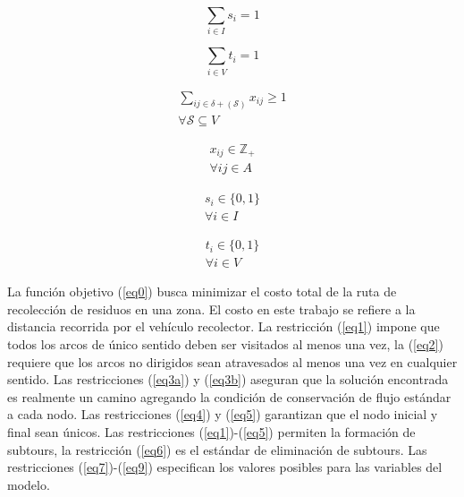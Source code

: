 \begin{equation} \tag{4} \label{eq4}
\sum_{i \in I} s_i = 1 
\end{equation}
\hbox{}

\begin{equation} \tag{5} \label{eq5}
\sum_{i \in V} t_i = 1 
\end{equation}
\hbox{}

\begin{equation} \tag{6} \label{eq6}
\begin{gathered}
    \sum_{i j \in \delta + (\mathcal{S})} x_{i j} \geq 1 \\
    \forall \mathcal{S} \subseteq V
\end{gathered}
\end{equation}
\hbox{}

\begin{equation} \tag{7} \label{eq7}
\begin{gathered}
    x_{i j} \in \mathbb{Z}_+ \\
    \forall i j \in A
\end{gathered}
\end{equation}
\hbox{}

\begin{equation} \tag{8} \label{eq8}
\begin{gathered}
    s_i \in \{0,1\} \\
    \forall i \in I
\end{gathered}
\end{equation}
\hbox{}

\begin{equation} \tag{9} \label{eq9}
\begin{gathered}
    t_i \in \{0,1\} \\
    \forall i \in V
\end{gathered}
\end{equation}

La función objetivo (\ref{eq0}) busca minimizar el costo total de la ruta de recolección de residuos en una zona. El costo en este trabajo se refiere a la distancia recorrida por el vehículo recolector. La restricción (\ref{eq1}) impone que todos los arcos de único sentido deben ser visitados al menos una vez, la (\ref{eq2}) requiere que los arcos no dirigidos sean atravesados al menos una vez en cualquier sentido. Las restricciones (\ref{eq3a}) y (\ref{eq3b}) aseguran que la solución encontrada es realmente un camino agregando la condición de conservación de flujo estándar a cada nodo. Las restricciones (\ref{eq4}) y (\ref{eq5}) garantizan que el nodo inicial y final sean únicos. Las restricciones (\ref{eq1})-(\ref{eq5}) permiten la formación de subtours, la restricción (\ref{eq6}) es el estándar de eliminación de subtours. Las restricciones (\ref{eq7})-(\ref{eq9}) especifican los valores posibles para las variables del modelo.

